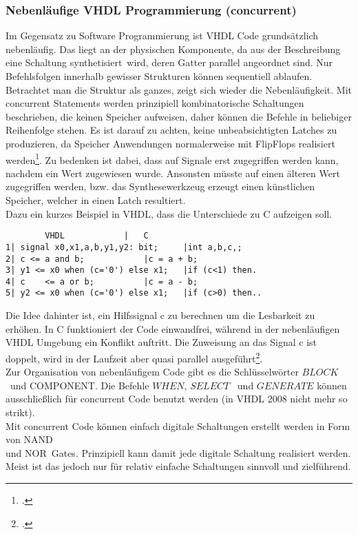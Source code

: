 \documentclass[12pt,a4paper]{scrartcl}	%
\begin{document}
\subsubsection{Nebenläufige VHDL Programmierung (concurrent)}
Im Gegensatz zu Software Programmierung ist VHDL Code grundsätzlich nebenläufig. Das liegt an der physischen Komponente, da aus der Beschreibung eine Schaltung \glqq synthetisiert\grqq~wird, deren Gatter parallel angeordnet sind. Nur Befehlsfolgen innerhalb gewisser Strukturen können sequentiell ablaufen. Betrachtet man die Struktur als ganzes, zeigt sich wieder die Nebenläufigkeit. Mit concurrent Statements werden prinzipiell kombinatorische Schaltungen beschrieben, die keinen Speicher aufweisen, daher können die Befehle in beliebiger Reihenfolge stehen. Es ist darauf zu achten, keine unbeabsichtigten Latches zu produzieren, da Speicher Anwendungen normalerweise mit FlipFlops realisiert werden\footcite[vgl.][S. 121 ff.]{VHDL}.
Zu bedenken ist dabei, dass auf Signale erst zugegriffen werden kann, nachdem ein Wert zugewiesen wurde.
Ansonsten müsste auf einen älteren Wert zugegriffen werden, bzw. das Synthesewerkzeug erzeugt einen künstlichen Speicher, welcher in einen Latch resultiert.\\
Dazu ein kurzes Beispiel in VHDL, dass die Unterschiede zu C aufzeigen soll.
\begin{lstlisting}
		VHDL			|	C
1| signal x0,x1,a,b,y1,y2: bit;		|int a,b,c,;	
2| c <= a and b;			|c = a + b;
3| y1 <= x0 when (c='0') else x1;	|if (c<1) then.
4| c	<= a or b;			|c = a - b;
5| y2 <= x0 when (c='0') else x1;	|if (c>0) then..

\end{lstlisting}
Die Idee dahinter ist, ein Hilfssignal c zu berechnen um die Lesbarkeit zu erhöhen. In C funktioniert der Code einwandfrei, während in der nebenläufigen VHDL Umgebung ein Konflikt auftritt. Die Zuweisung an das Signal c ist doppelt, wird in der Laufzeit aber quasi parallel ausgeführt\footcite[vgl.][Abruf am 14.11.2017]{V}.\\
Zur Organisation von nebenläufigem Code gibt es die Schlüsselwörter $BLOCK$~und \glqq COMPONENT\grqq. Die Befehle $WHEN$, $SELECT$~ und $GENERATE$ können ausschließlich für concurrent Code benutzt werden (in VHDL 2008 nicht mehr so strikt).\\
Mit concurrent Code können einfach digitale Schaltungen erstellt werden in Form von \glqq NAND\grqq\\
und \glqq NOR\grqq~Gates.
Prinzipiell kann damit jede digitale Schaltung realisiert werden. Meist ist das jedoch nur für relativ einfache Schaltungen sinnvoll und zielführend.
\end{document}
